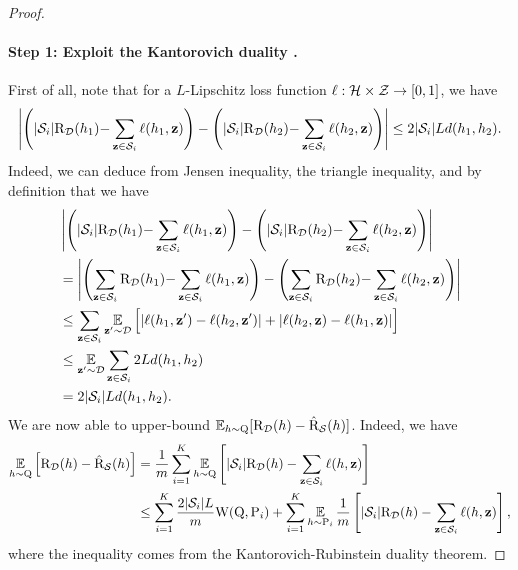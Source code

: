 \begin{noaddcontents}
\begin{proof}
    \paragraph{Step 1: Exploit the Kantorovich duality \cite[Remark 6.5]{villani2009optimal}.}
    First of all, note that for a $L$-Lipschitz loss function $\ell: \mathcal{H}\times\mathcal{Z}\to[0,1]$, we have
    \begin{align}
    \left\vert\left( |\mathcal{S}_i|\text{R}_{\mathcal{D}}(h_1){-}\sum_{\mathbf{z}\in\mathcal{S}_i}\ell(h_1, \mathbf{z})\right) - \left( |\mathcal{S}_i|\text{R}_{\mathcal{D}}(h_2){-}\sum_{\mathbf{z}\in\mathcal{S}_i}\ell(h_2, \mathbf{z})\right)\right\vert \le 2|\mathcal{S}_i|Ld(h_1, h_2).\label{eq:proof-supervised-ht-1}
    \end{align}
    Indeed, we can deduce  from Jensen inequality, the triangle inequality, and by definition that we have
    \begin{align*}
    &\left\vert\left( |\mathcal{S}_i|\text{R}_{\mathcal{D}}(h_1){-}\sum_{\mathbf{z}\in\mathcal{S}_i}\ell(h_1, \mathbf{z})\right) - \left( |\mathcal{S}_i|\text{R}_{\mathcal{D}}(h_2){-}\sum_{\mathbf{z}\in\mathcal{S}_i}\ell(h_2, \mathbf{z})\right)\right\vert\\
    &= \left\vert\left(\sum_{\mathbf{z}\in\mathcal{S}_i}\text{R}_{\mathcal{D}}(h_1){-}\sum_{\mathbf{z}\in\mathcal{S}_i}\ell(h_1, \mathbf{z})\right) - \left(\sum_{\mathbf{z}\in\mathcal{S}_i}\text{R}_{\mathcal{D}}(h_2){-}\sum_{\mathbf{z}\in\mathcal{S}_i}\ell(h_2, \mathbf{z})\right)\right\vert\\
    &\le \sum_{\mathbf{z}\in\mathcal{S}_i}\operatorname*{\mathbb{E}}_{\mathbf{z}'\sim\mathcal{D}}\Big[ |\ell(h_1, \mathbf{z}')-\ell(h_2, \mathbf{z}')|+|\ell(h_2, \mathbf{z})-\ell(h_1, \mathbf{z})|\Big]\\
    &\le \operatorname*{\mathbb{E}}_{\mathbf{z}'\sim\mathcal{D}}\sum_{\mathbf{z}\in\mathcal{S}_i} 2Ld(h_1, h_2)\\
    &= 2|\mathcal{S}_i|Ld(h_1, h_2).
    \end{align*}
    We are now able to upper-bound $\operatorname*{\mathbb{E}}_{h\sim\mathrm{Q}}[ \text{R}_{\mathcal{D}}(h) - \hat{\text{R}}_{\mathcal{S}}(h) ]$. 
    Indeed, we have
    \begin{align}
    \operatorname*{\mathbb{E}}_{h\sim\mathrm{Q}}\Big[ \text{R}_{\mathcal{D}}(h) - \hat{\text{R}}_{\mathcal{S}}(h) \Big] &= \frac{1}{m}\sum_{i=1}^{K} \operatorname*{\mathbb{E}}_{h\sim\mathrm{Q}}\left[ |\mathcal{S}_i|\text{R}_{\mathcal{D}}(h) - \sum_{\mathbf{z}\in\mathcal{S}_i}\ell(h, \mathbf{z}) \right]\nonumber\\
    &\le \sum_{i=1}^{K} \frac{2|\mathcal{S}_i|L}{m}\mathrm{W}(\mathrm{Q}, \mathrm{P}_i) + \sum_{i=1}^{K} \operatorname*{\mathbb{E}}_{h\sim\mathrm{P}_i} \frac{1}{m}\left[ |\mathcal{S}_i|\text{R}_{\mathcal{D}}(h) - \sum_{\mathbf{z}\in\mathcal{S}_i} \ell(h, \mathbf{z}) \right],\label{eq:proof-supervised-ht-2}
    \end{align}
    where the inequality comes from the Kantorovich-Rubinstein duality theorem.
    

\end{proof}
\end{noaddcontents}
